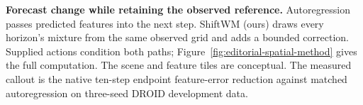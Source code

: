 \textbf{Forecast change while retaining the observed reference.} Autoregression passes predicted features into the next step. ShiftWM (ours) draws every horizon's mixture from the same observed grid and adds a bounded correction. Supplied actions condition both paths; Figure~\ref{fig:editorial-spatial-method} gives the full computation. The scene and feature tiles are conceptual. The measured callout is the native ten-step endpoint feature-error reduction against matched autoregression on three-seed DROID development data.
